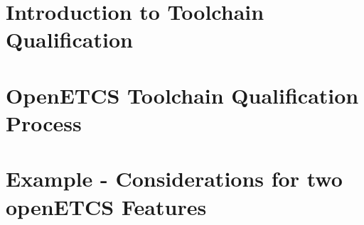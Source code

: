 \documentclass{openetcs_report}
\begin{document}
\mainmatter







\chapter{Introduction to Toolchain Qualification}
\label{chap-1}




\chapter{OpenETCS Toolchain Qualification Process}
\label{chap-2}


\chapter{Example - Considerations for two openETCS Features}
\label{chap-example}



\end{document}
